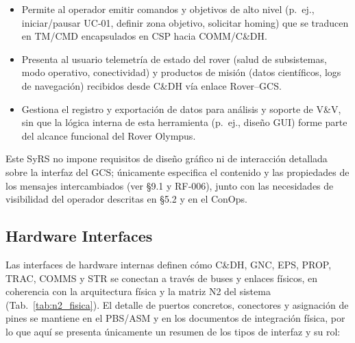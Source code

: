 \begin{itemize}
    \item Permite al operador emitir comandos y objetivos de alto nivel (p.\ ej., iniciar/pausar UC‑01, definir zona objetivo, solicitar homing) que se traducen en TM/CMD encapsulados en CSP hacia COMM/C\&DH.
    \item Presenta al usuario telemetría de estado del rover (salud de subsistemas, modo operativo, conectividad) y productos de misión (datos científicos, logs de navegación) recibidos desde C\&DH vía enlace Rover–GCS.
    \item Gestiona el registro y exportación de datos para análisis y soporte de V\&V, sin que la lógica interna de esta herramienta (p.\ ej., diseño GUI) forme parte del alcance funcional del Rover Olympus.
\end{itemize}

Este SyRS no impone requisitos de diseño gráfico ni de interacción detallada sobre la interfaz del GCS; únicamente especifica el contenido y las propiedades de los mensajes intercambiados (ver §9.1 y RF‑006), junto con las necesidades de visibilidad del operador descritas en §5.2 y en el ConOps.

\subsection{Hardware Interfaces}\label{subsec:hardware_interfaces}

Las interfaces de hardware internas definen cómo C\&DH, GNC, EPS, PROP, TRAC, COMMS y STR se conectan a través de buses y enlaces físicos, en coherencia con la arquitectura física y la matriz N2 del sistema (Tab.~\ref{tab:n2_fisica}). El detalle de puertos concretos, conectores y asignación de pines se mantiene en el PBS/ASM y en los documentos de integración física, por lo que aquí se presenta únicamente un resumen de los tipos de interfaz y su rol:


